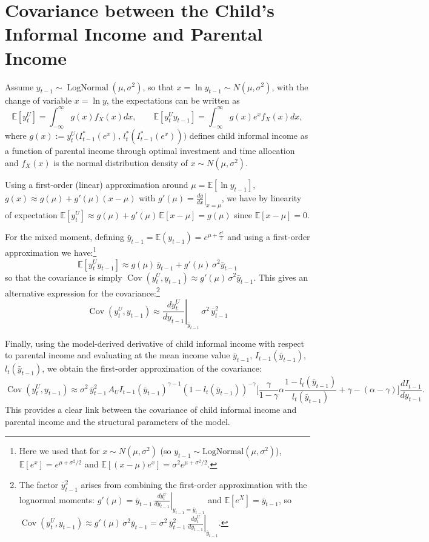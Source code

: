 \documentclass[12pt]{article}
\begin{document}
\section*{Covariance between the Child's Informal Income and Parental Income}
Assume \(y_{t-1} \sim \operatorname{LogNormal}(\mu,\sigma^2)\), so that \(x = \ln y_{t-1} \sim N(\mu,\sigma^2)\), with the change of variable \(x = \ln y\), the expectations can be written as
\[
\mathbb{E}[y_t^U] = \int_{-\infty}^{\infty} g(x) f_X(x) dx, \qquad
\mathbb{E}[y_t^U y_{t-1}] = \int_{-\infty}^{\infty} g(x) e^x f_X(x) dx,
\]
where  $ g(x) := y_t^U\big(I_{t-1}^*(e^x),\, l_t^*(I_{t-1}^*(e^x))\big)$  defines child informal income as a function of parental income through optimal investment and time allocation and $f_X(x)$ is the normal distribution density of $x\sim N(\mu,\sigma^2)$.


Using a first-order (linear) approximation around \(\mu = \mathbb{E}[\ln y_{t-1}]\), \(g(x) \approx g(\mu) + g'(\mu)(x-\mu)\) with \(g'(\mu) = \left. \frac{dg}{dx} \right|_{x=\mu}\), we have by linearity of expectation $\mathbb{E}[y_t^U] \approx g(\mu) + g'(\mu)\,\mathbb{E}[x-\mu] = g(\mu)$ since \(\mathbb{E}[x-\mu]=0\).


For the mixed moment, defining $\bar{y}_{t-1} = \mathbb{E}(y_{t-1}) = e^{\mu+\frac{\sigma^2}{2}}$ and using a first-order approximation we have:\footnote{Here we used that for \(x\sim N(\mu,\sigma^2)\) (so \(y_{t-1}\sim\text{LogNormal}(\mu,\sigma^2)\)), \(\mathbb{E}[e^x] = e^{\mu+\sigma^2/2}\) and \(\mathbb{E}[(x-\mu)e^x] = \sigma^2 e^{\mu+\sigma^2/2}\).}
\[
\mathbb{E}[y_t^U y_{t-1}] \approx g(\mu)\, \bar{y}_{t-1} + g'(\mu)\, \sigma^2 \bar{y}_{t-1}
\]
so that the covariance is simply $\operatorname{Cov}(y_t^U, y_{t-1}) \approx g'(\mu)\, \sigma^2 \bar{y}_{t-1}$. This gives an alternative expression for the covariance:\footnote{The factor $\bar{y}_{t-1}^2$ arises from combining the first-order approximation with the lognormal moments: $g'(\mu) = \bar{y}_{t-1}\, \left. \frac{d y_t^U}{d y_{t-1}} \right|_{y_{t-1} = \bar{y}_{t-1}}$ and $\mathbb{E}[e^X] = \bar{y}_{t-1}$, so $\operatorname{Cov}(y_t^U, y_{t-1}) \approx g'(\mu)\, \sigma^2 \bar{y}_{t-1} = \sigma^2 \, \bar{y}_{t-1}^2 \, \left. \frac{d y_t^U}{d y_{t-1}} \right|_{\bar{y}_{t-1}}$.}
 \[  \operatorname{Cov}(y_t^U, y_{t-1}) \approx \left. \frac{d y_t^U}{d y_{t-1}} \right|_{\bar{y}_{t-1}} \, \sigma^2 \, \bar{y}_{t-1}^2   \] 
 
 Finally, using the model-derived derivative of child informal income with respect to parental income and evaluating at the mean income value \(\bar{y}_{t-1}\), \(I_{t-1}(\bar{y}_{t-1})\), \(l_t(\bar{y}_{t-1})\), we obtain the first-order approximation of the covariance:
\[
\operatorname{Cov}(y_t^U, y_{t-1}) \approx \sigma^2 \,\bar{y}_{t-1}^2 \, 
A_U I_{t-1}(\bar{y}_{t-1})^{\gamma-1} (1-l_t(\bar{y}_{t-1}))^{-\gamma} 
\Big[\frac{\gamma}{1-\gamma} \alpha\frac{1-l_t(\bar{y}_{t-1})}{l_t(\bar{y}_{t-1})}+\gamma - (\alpha-\gamma) \Big] \frac{d I_{t-1}}{d y_{t-1}}
.
\]
This provides a clear link between the covariance of child informal income and parental income and the structural parameters of the model.
\end{document}
